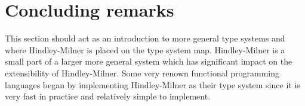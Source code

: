 \section{Concluding remarks}
This section should act as an introduction to more general type systems and where Hindley-Milner is placed on the type system map.
Hindley-Milner is a small part of a larger more general system which has significant impact on the extensibility of Hindley-Milner.
Some very renown functional programming languages began by implementing Hindley-Milner as their type system since it is very fast in practice and relatively simple to implement.

